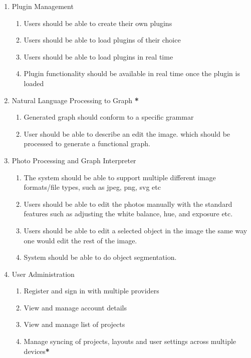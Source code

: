 \documentclass[11pt,a4paper]{article}
\begin{document}
\begin{enumerate}[label=\arabic*.]
    \item Plugin Management
          \begin{enumerate}[label*=\arabic*.]
              \item Users should be able to create their own plugins
              \item Users should be able to load plugins of their choice
              \item Users should be able to load plugins in real time
              \item Plugin functionality should be available in real time once the plugin is loaded
          \end{enumerate}

    \item Natural Language Processing to Graph \textbf{*}
          \begin{enumerate}[label*=\arabic*.]
              \item Generated graph should conform to a specific grammar
              \item User should be able to describe an edit the image.
                    which should be processed to generate a functional graph.
          \end{enumerate}

    \item Photo Processing and Graph Interpreter
          \begin{enumerate}[label*=\arabic*.]
              \item The system should be able to support multiple different image formats/file
                    types, such as jpeg, png, svg etc
              \item Users should be able to edit the photos manually with the standard
                    features such as adjusting the white balance, hue, and exposure etc.
              \item Users should be able to edit a selected object in the image the
                    same way one would edit the rest of the image.
              \item System should be able to do object segmentation.
          \end{enumerate}

    \item User Administration
          \begin{enumerate}[label*=\arabic*.]
              \item Register and sign in with multiple providers
              \item View and manage account details
              \item View and manage list of projects
              \item Manage syncing of projects, layouts and user settings across multiple
                    devices\textbf{*}
          \end{enumerate}
\end{enumerate}
\end{document}
